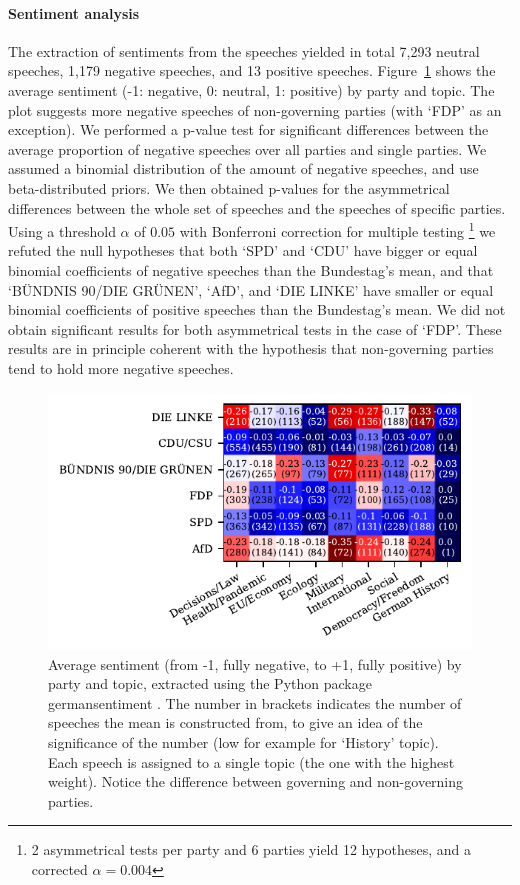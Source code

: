 \documentclass{article}
\begin{document}
\paragraph{Sentiment analysis}
The extraction of sentiments from the speeches yielded in total 7,293 neutral speeches, 1,179 negative speeches, and 13 positive speeches.
Figure~\ref{sentiments_plot} shows the average sentiment (-1: negative, 0: neutral, 1: positive) by party and topic.
The plot suggests more negative speeches of non-governing parties (with `FDP' as an exception).
We performed a p-value test for significant differences between the average proportion of negative speeches over all parties and single parties.
We assumed a binomial distribution of the amount of negative speeches, and use beta-distributed priors.
We then obtained p-values for the asymmetrical differences between the whole set of speeches and the speeches of specific parties.
Using a threshold $\alpha$ of $0.05$ with Bonferroni correction for multiple testing
\footnote{2 asymmetrical tests per party and 6 parties yield 12 hypotheses, and a corrected $\alpha=0.004$}
we refuted the null hypotheses that both `SPD' and `CDU' have bigger or equal binomial coefficients of negative speeches than the Bundestag's mean,
and that `BÜNDNIS 90/DIE GRÜNEN', `AfD', and `DIE LINKE' have smaller or equal binomial coefficients of positive speeches than the Bundestag's mean.
We did not obtain significant results for both asymmetrical tests in the case of `FDP'.
These results are in principle coherent with the hypothesis that non-governing parties tend to hold more negative speeches.

\begin{figure}
  \centering
  \includegraphics[width=0.9\linewidth]{images/sentiments_confusion.pdf}
  \captionsetup{width=0.9\linewidth}
  \caption{
    Average sentiment (from -1, fully negative, to +1, fully positive) by party and topic, extracted using the Python package germansentiment \cite{Germansentiment}.
    The number in brackets indicates the number of speeches the mean is constructed from, to give an idea of the significance of the number (low for example for `History' topic).
    Each speech is assigned to a single topic (the one with the highest weight).
    Notice the difference between governing and non-governing parties.
  }
  \label{sentiments_plot}
\end{figure}
\end{document}
